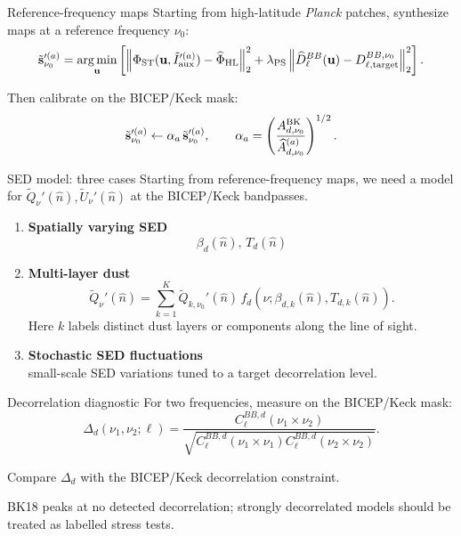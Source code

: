 \documentclass[aspectratio=169,11pt]{beamer}
\newcommand{\bk}{BICEP/Keck}
\newcommand{\Planck}{\textit{Planck}}
\newcommand{\st}{\mathrm{ST}}
\begin{document}
\begin{frame}{Reference-frequency maps}
  \small
  Starting from high-latitude \Planck{} patches, synthesize maps at a reference frequency $\nu_0$:
  \[
    \tilde{\mathbf s}_{\nu_0}^{\prime(a)}
    =
    \operatorname*{arg\,min}_{\mathbf u}
    \left[
      \left\|
        \Phi_{\st}(\mathbf u,\tilde I_{\rm aux}^{\prime(a)})
        -
        \widehat\Phi_{\rm HL}
      \right\|_2^2
      +
      \lambda_{\rm PS}
      \left\|
        \widehat D_\ell^{BB}(\mathbf u)
        -
        D_{\ell,{\rm target}}^{BB,\nu_0}
      \right\|_2^2
    \right].
  \]

  \vspace{0.35cm}
  Then calibrate on the \bk{} mask:
  \[
    \tilde{\mathbf s}_{\nu_0}^{\prime(a)}
    \leftarrow
    \alpha_a\,\tilde{\mathbf s}_{\nu_0}^{\prime(a)},
    \qquad
    \alpha_a =
    \left(
      \frac{A_{d,\nu_0}^{\rm BK}}
           {\widehat A_{d,\nu_0}^{(a)}}
    \right)^{1/2}.
  \]
\end{frame}

\begin{frame}{SED model: three cases}
  \small
  Starting from reference-frequency maps, we need a model for
  $\tilde Q_\nu'(\hat n),\tilde U_\nu'(\hat n)$ at the \bk{} bandpasses.

  \vspace{0.25cm}
  \begin{enumerate}
    \item \textbf{Spatially varying SED}
    \[
      \beta_d(\hat n),\,T_d(\hat n)
    \]

    \item \textbf{Multi-layer dust}
    \[
      \tilde Q_\nu'(\hat n)
      =
      \sum_{k=1}^{K}
      \tilde Q_{k,\nu_0}'(\hat n)\,
      f_d(\nu;\beta_{d,k}(\hat n),T_{d,k}(\hat n)).
    \]
    Here $k$ labels distinct dust layers or components along the line of sight.

    \item \textbf{Stochastic SED fluctuations}\\
    small-scale SED variations tuned to a target decorrelation level.
  \end{enumerate}
\end{frame}

\begin{frame}{Decorrelation diagnostic}
  \small
  For two frequencies, measure on the \bk{} mask:
  \[
    \Delta_d(\nu_1,\nu_2;\ell)
    =
    \frac{C_\ell^{BB,d}(\nu_1\times\nu_2)}
    {\sqrt{C_\ell^{BB,d}(\nu_1\times\nu_1)
           C_\ell^{BB,d}(\nu_2\times\nu_2)}}.
  \]

  \vspace{0.5cm}
  \begin{center}
    \Large
    Compare $\Delta_d$ with the \bk{} decorrelation constraint.
  \end{center}

  \vspace{0.25cm}
  \begin{center}
    BK18 peaks at no detected decorrelation; strongly decorrelated models
    should be treated as labelled stress tests.
  \end{center}
\end{frame}
\end{document}
